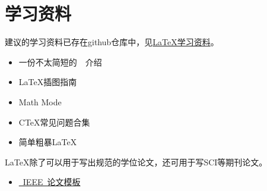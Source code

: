 \chapter{学习资料}
\label{chap:material}

建议的学习资料已存在github仓库中，见\href{https://github.com/BIT-thesis/LaTeX-template/tree/master/LaTeX%E5%AD%A6%E4%B9%A0%E8%B5%84%E6%96%99}{LaTeX学习资料}。

\begin{itemize}

\item 一份不太简短的~\LaTeXe{}~介绍
\item \LaTeX 插图指南
\item Math Mode
\item C\TeX 常见问题合集
\item 简单粗暴LaTeX

\end{itemize}

\LaTeX 除了可以用于写出规范的学位论文，还可用于写SCI等期刊论文。

\begin{itemize}
\item \href{http://www.ctan.org/tex-archive/macros/latex/contrib/IEEEtran/}{~IEEE~论文模板}

\end{itemize}